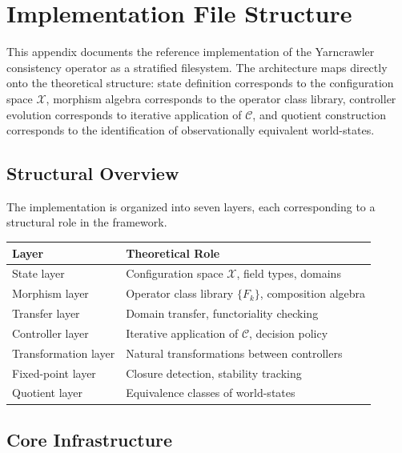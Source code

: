 \documentclass[11pt, oneside]{article}
\begin{document}
\section{Implementation File Structure}
\label{app:implementation}

This appendix documents the reference implementation of the Yarncrawler consistency
operator as a stratified filesystem. The architecture maps directly onto the theoretical
structure: state definition corresponds to the configuration space $\mathcal{X}$,
morphism algebra corresponds to the operator class library, controller evolution
corresponds to iterative application of $\mathcal{C}$, and quotient construction
corresponds to the identification of observationally equivalent world-states.

\subsection{Structural Overview}

The implementation is organized into seven layers, each corresponding to a structural
role in the framework.

\begin{center}
\begin{tabular}{ll}
\toprule
\textbf{Layer} & \textbf{Theoretical Role} \\
\midrule
State layer & Configuration space $\mathcal{X}$, field types, domains \\
Morphism layer & Operator class library $\{F_k\}$, composition algebra \\
Transfer layer & Domain transfer, functoriality checking \\
Controller layer & Iterative application of $\mathcal{C}$, decision policy \\
Transformation layer & Natural transformations between controllers \\
Fixed-point layer & Closure detection, stability tracking \\
Quotient layer & Equivalence classes of world-states \\
\bottomrule
\end{tabular}
\end{center}

\subsection{Core Infrastructure}
\end{document}
